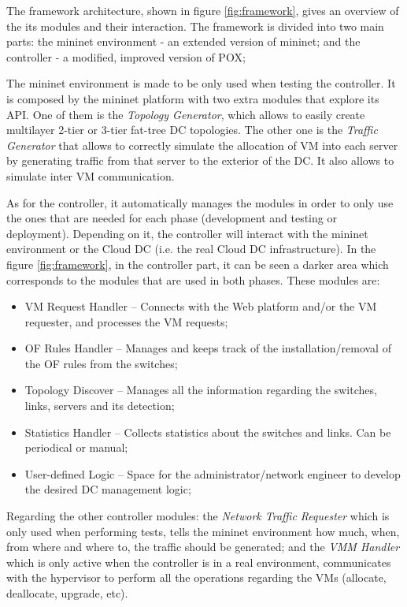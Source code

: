 \documentclass[12pt,english,oneside]{book}
\begin{document}
The framework architecture, shown in figure \ref{fig:framework}, gives an overview of the its modules and their interaction.
The framework is divided into two main parts: the mininet environment - an extended version of mininet; and the controller - a modified, improved version of POX;

The mininet environment is made to be only used when testing the controller.
It is composed by the mininet platform with two extra modules that explore its API.
One of them is the {\it Topology Generator}, which allows to easily create multilayer 2-tier or 3-tier fat-tree DC topologies.
The other one is the {\it Traffic Generator} that allows to correctly simulate the allocation of VM into each server by generating traffic from that server to the exterior of the DC. It also allows to simulate inter VM communication.

As for the controller, it automatically manages the modules in order to only use the ones that are needed for each phase (development and testing or deployment).
Depending on it, the controller will interact with the mininet environment or the Cloud DC (i.e. the real Cloud DC infrastructure).
In the figure \ref{fig:framework}, in the controller part, it can be seen a darker area which corresponds to the modules that are used in both phases. These modules are:
\begin{itemize}
  \item VM Request Handler -- Connects with the Web platform and/or the VM requester, and processes the VM requests;
  \item OF Rules Handler -- Manages and keeps track of the installation/removal of the OF rules from the switches;
  \item Topology Discover -- Manages all the information regarding the switches, links, servers and its detection;
  \item Statistics Handler -- Collects statistics about the switches and links. Can be periodical or manual;
  \item User-defined Logic -- Space for the administrator/network engineer to develop the desired DC management logic;
\end{itemize}

Regarding the other controller modules: the {\it Network Traffic Requester} which is only used when performing tests, tells the mininet environment how much, when, from where and where to, the traffic should be generated; and the {\it VMM Handler} which is only active when the controller is in a real environment, communicates with the hypervisor to perform all the operations regarding the VMs (allocate, deallocate, upgrade, etc).
\end{document}
